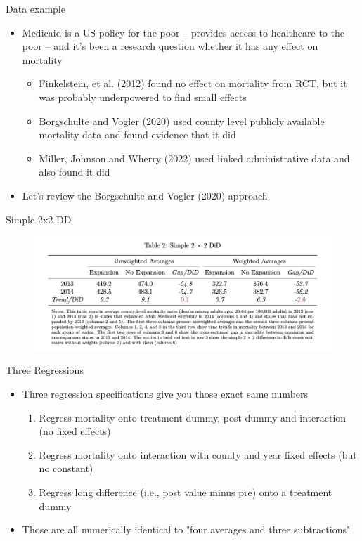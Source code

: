 \documentclass{beamer}
\begin{document}
\begin{frame}{Data example}

\begin{itemize}
\item Medicaid is a US policy for the poor -- provides access to healthcare to the poor -- and it's been a research question whether it has any effect on mortality
	\begin{itemize}
	\item Finkelstein, et al. (2012) found no effect on mortality from RCT, but it was probably underpowered to find small effects
	\item Borgschulte and Vogler (2020) used county level publicly available mortality data and found evidence that it did
	\item Miller, Johnson and Wherry (2022) used linked administrative data and also found it did
	\end{itemize}
\item Let's review the Borgschulte and Vogler (2020) approach

\end{itemize}

\end{frame}

\begin{frame}{Simple 2x2 DD}

\begin{figure}
    \centering
    \includegraphics[height=0.5\textheight]{./lecture_includes/simple2x2.png}
\end{figure}


\end{frame}

\begin{frame}{Three Regressions}

\begin{itemize}
\item Three regression specifications give you those exact same numbers
	\begin{enumerate}
	\item Regress mortality onto treatment dummy, post dummy and interaction (no fixed effects)
	\item Regress mortality onto interaction with county and year fixed effects (but no constant)
	\item Regress long difference (i.e., post value minus pre) onto a treatment dummy
	\end{enumerate}
\item Those are all numerically identical to "four averages and three subtractions"
\end{itemize}

\end{frame}
\end{document}
